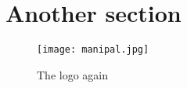 

\section{Another section}
\label{an_sec}

\begin{frame}
\begin{figure}[h]
  \centering
    \texttt{[image: manipal.jpg]}
    \caption{The logo again}
    \label{fig:logo}
\end{figure}
\end{frame}




